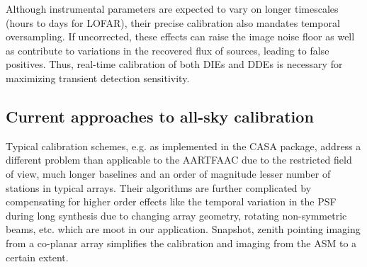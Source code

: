 \documentclass{aa}
\begin{document}
Although  instrumental parameters  are  expected to  vary  on longer  timescales
(hours  to days  for LOFAR),  their precise  calibration also  mandates temporal
oversampling.  If uncorrected, these effects  can raise the image noise floor as
well as  contribute to variations in  the recovered flux of  sources, leading to
false positives.  Thus, real-time calibration of both DIEs and DDEs is necessary
for maximizing transient detection sensitivity.

\subsection{Current approaches to all-sky calibration}
Typical calibration schemes, e.g. as  implemented in the CASA package, address a
different problem than applicable to the AARTFAAC due to the restricted field of
view, much longer baselines and an  order of magnitude lesser number of stations
in typical arrays. Their algorithms  are further complicated by compensating for
higher  order  effects  like the  temporal  variation  in  the PSF  during  long
synthesis  due  to  changing   array  geometry,  rotating  non-symmetric  beams,
etc. which are moot in our application. Snapshot, zenith pointing imaging from a
co-planar array simplifies the calibration and imaging from the ASM to a certain
extent.
\end{document}
